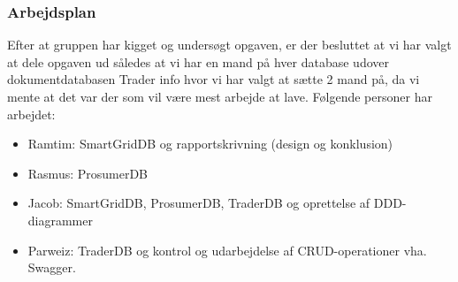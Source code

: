 \subsubsection{Arbejdsplan}

Efter at gruppen har kigget og undersøgt opgaven, er der besluttet at vi har valgt at dele opgaven ud således at vi har en mand på hver database udover dokumentdatabasen Trader info hvor vi har valgt at sætte 2 mand på, da vi mente at det var der som vil være mest arbejde at lave. Følgende personer har arbejdet:
\begin{itemize}
    \item Ramtim: SmartGridDB og rapportskrivning (design og konklusion)
    \item Rasmus: ProsumerDB 
    \item Jacob: SmartGridDB, ProsumerDB, TraderDB og oprettelse af DDD-diagrammer
    \item Parweiz: TraderDB og kontrol og udarbejdelse af CRUD-operationer vha. Swagger.
\end{itemize}

